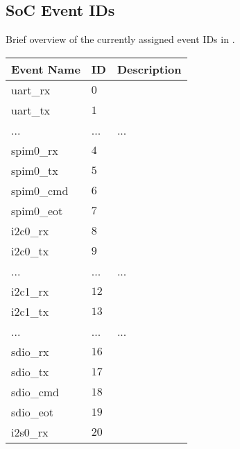 \subsection{SoC Event IDs}
Brief overview of the currently assigned event IDs in \pulpissimo.
{\small
\begin{tabularx}{\textwidth}{|l|l|X|}
  \hline
  \textbf{Event Name} & \textbf{ID}  & \textbf{Description} \\
  \hline
  uart\_rx                & $0$              &               \\
  \hline
  uart\_tx                & $1$              &               \\
  \hline
  ...                     & ...              & ...           \\
  \hline
  spim0\_rx               & $4$              &               \\
  \hline
  spim0\_tx               & $5$              &               \\
  \hline
  spim0\_cmd              & $6$              &               \\
  \hline
  spim0\_eot              & $7$              &               \\
  \hline
  i2c0\_rx                & $8$              &               \\
  \hline
  i2c0\_tx                & $9$              &               \\
  \hline
  ...                     & ...              & ...           \\
  \hline
  i2c1\_rx                & $12$             &               \\
  \hline
  i2c1\_tx                & $13$             &               \\
  \hline
  ...                     & ...              & ...           \\
  \hline
  sdio\_rx                & $16$             &               \\
  \hline
  sdio\_tx                & $17$             &               \\
  \hline
  sdio\_cmd               & $18$             &               \\
  \hline
  sdio\_eot               & $19$             &               \\
  \hline
  i2s0\_rx                & $20$             &               \\

\end{tabularx}}
